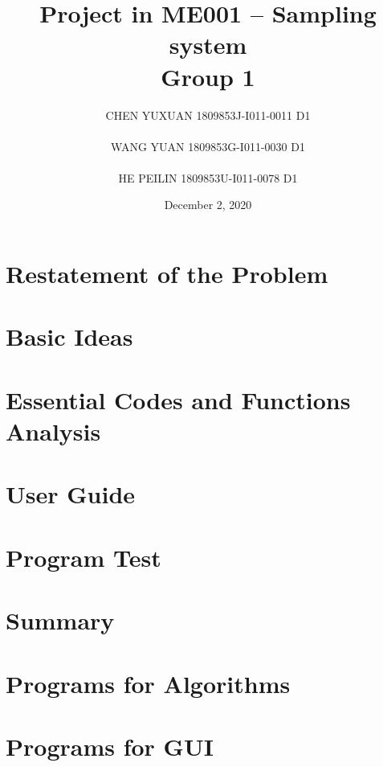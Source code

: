 \documentclass[12pt]{article}
\numberwithin{figure}{subsection}
\numberwithin{table}{subsection}
\begin{document}
\title{\textbf{Project in ME001 -- Sampling system\\Group 1}}

\author{CHEN YUXUAN 1809853J-I011-0011 D1\\ \\
WANG YUAN 1809853G-I011-0030 D1\\ \\
HE PEILIN 1809853U-I011-0078 D1}

\date{December 2, 2020}
\maketitle

\newpage
\tableofcontents
\newpage

\section{Restatement of the Problem}


\section{Basic Ideas}


\section{Essential Codes and Functions Analysis}


\section{User Guide}


\section{Program Test}


\section{Summary}




\newpage
\appendix
\appendixpage
\addappheadtotoc
    \section{Programs for Algorithms}
        \lstset{title=\lstname}
        
    \section{Programs for GUI}
        \lstset{title=\lstname}
        
\end{document}
